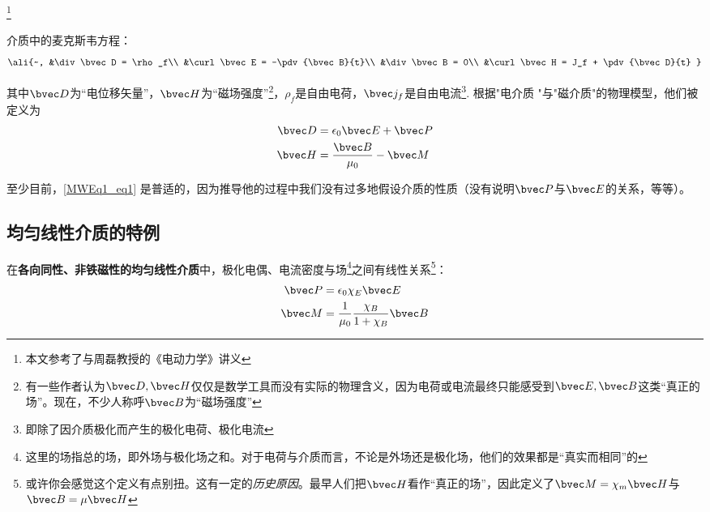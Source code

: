 
\footnote{本文参考了\cite{GriffE}与周磊教授的《电动力学》讲义}
\begin{issues}
\issueDraft
\end{issues}

介质中的麦克斯韦方程：
\begin{equation}\label{MWEq1_eq1}\ali{~,
&\div\bvec D = \rho_f\\
&\curl\bvec E = -\pdv{\bvec B}{t}\\
&\div\bvec B = 0\\
&\curl\bvec H = J_f + \pdv{\bvec D}{t}
}\end{equation}

其中$\bvec D$为“电位移矢量”，$\bvec H$为“磁场强度”\footnote{有一些作者认为$\bvec D, \bvec H$仅仅是数学工具而没有实际的物理含义，因为电荷或电流最终只能感受到$\bvec E, \bvec B$这类“真正的场”。现在，不少人称呼$\bvec B$为“磁场强度”}，$\rho_f$是自由电荷，$\bvec j_f$是自由电流\footnote{即除了因介质极化而产生的极化电荷、极化电流}. 根据"电介质  "与"磁介质"的物理模型，他们被定义为
\begin{align}
\bvec D &= \epsilon_0 \bvec E + \bvec P\\
\bvec H &= \frac{\bvec B}{\mu_0} - \bvec M\\
\end{align}

至少目前，\autoref{MWEq1_eq1} 是普适的，因为推导他的过程中我们没有过多地假设介质的性质（没有说明$\bvec P$与$\bvec E$的关系，等等）。

\subsection{均匀线性介质的特例}
在\textbf{各向同性、非铁磁性的均匀线性介质}中，极化电偶、电流密度与场\footnote{这里的场指总的场，即外场与极化场之和。对于电荷与介质而言，不论是外场还是极化场，他们的效果都是“真实而相同”的}之间有线性关系\footnote{或许你会感觉这个定义有点别扭。这有一定的\textsl{历史原因}。最早人们把$\bvec H$看作“真正的场”，因此定义了$\bvec M = \chi_m \bvec H$与$\bvec B = \mu \bvec H$}：
\begin{align}
\bvec P &= \epsilon_0 \chi_E \bvec E\\
\bvec M &= \frac{1}{\mu_0} \frac{\chi_B}{1+\chi_B}\bvec B\\
\end{align}

